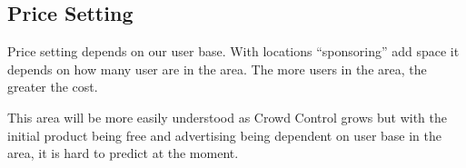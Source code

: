 \subsection{Price Setting}
Price setting depends on our user base. With locations “sponsoring” add space it depends on how many user are in the area. The more users in the area, the greater the cost.

This area will be more easily understood as Crowd Control grows but with the initial product being free and advertising being dependent on user base in the area, it is hard to predict at the moment.






